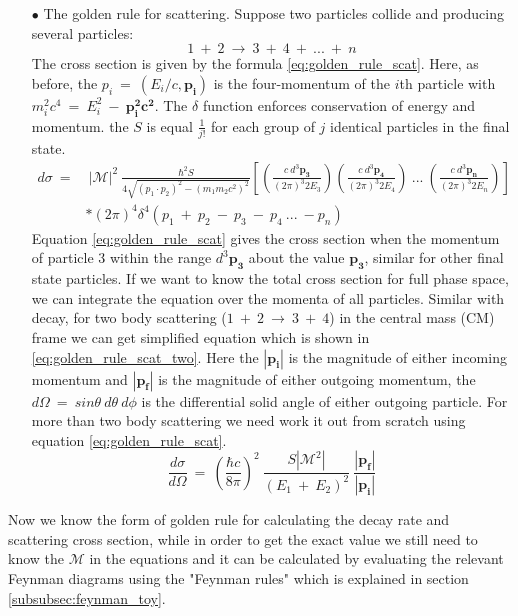 \begin{itemize}
\item[$\bullet$] The golden rule for scattering.
 Suppose two particles collide and producing several particles:
 \begin{equation}
1~+~2~\rightarrow~3~+~4~+~...~+~n
 \label{eq:two_scat}
\end{equation}
The cross section is given by the formula \ref{eq:golden_rule_scat}. Here, as before, the $p_{i}~=~(E_{i}/c,\mathbf{p_{i}})$ is the four-momentum of the $i$th particle with $m_{i}^{2}c^{4}~=~E_{i}^{2}~-~\mathbf{p_{i}^{2}c^{2}}$. The $\delta$ function enforces conservation of energy and momentum. the $S$ is equal $\frac{1}{j!}$ for each group of $j$ identical particles in the final state.
\begin{equation}
\begin{split}
d\sigma~=&~|\mathcal{M}|^{2}~\frac{\hbar^{2}S}{4\sqrt{(p_{1}\cdot p_{2})^{2}-(m_{1}m_{2}c^{2})^{2}}}[(\frac{c~d^{3}\mathbf{p_{3}}}{(2\pi)^{3}2E_{3}})(\frac{c~d^{3}\mathbf{p_{4}}}{(2\pi)^{3}2E_{4}})~...~(\frac{c~d^{3}\mathbf{p_{n}}}{(2\pi)^{3}2E_{n}})]\\
&*(2\pi)^{4}\delta^{4}(p_{1}~+~p_{2}~-~p_{3}~-~p_{4}~...~-p_{n})
\end{split}
\label{eq:golden_rule_scat}
\end{equation}
Equation \ref{eq:golden_rule_scat} gives the cross section when the momentum of particle 3 within the range $d^{3}\mathbf{p_{3}}$ about the value $\mathbf{p_{3}}$, similar for other final state particles. If we want to know the total cross section for full phase space, we can integrate the equation over the momenta of all particles.
Similar with decay, for two body scattering ($1~+~2~\rightarrow~3~+~4$) in the central mass (CM) frame we can get simplified equation which is shown in \ref{eq:golden_rule_scat_two}. Here the $|\mathbf{p_{i}}|$ is the magnitude of either incoming momentum and $|\mathbf{p_{f}}|$ is the magnitude of either outgoing momentum, the $d\Omega~=~sin\theta~d\theta~d\phi$ is the differential solid angle of either outgoing particle. For more than two body scattering we need work it out from scratch using equation \ref{eq:golden_rule_scat}.
\begin{equation}
\frac{d\sigma}{d\Omega}~=~(\frac{\hbar c}{8\pi})^{2}~\frac{S|\mathcal{M}^{2}|}{(E_{1}~+~E_{2})^{2}}~\frac{|\mathbf{p_{f}}|}{|\mathbf{p_{i}}|}
\label{eq:golden_rule_scat_two}
\end{equation}
\end{itemize}

Now we know the form of golden rule for calculating the decay rate and scattering cross section, while in order to get the exact value we still need to know the $\mathcal{M}$ in the equations and it can be calculated by evaluating the relevant Feynman diagrams using the "Feynman rules" which is explained in section \ref{subsubsec:feynman_toy}.

